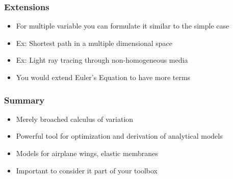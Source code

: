 \documentclass[10pt]{beamer}
\begin{document}
\begin{frame}
  \frametitle{Extensions}
  \begin{itemize}
  \item For multiple variable you can formulate it similar to the simple case
  \item Ex: Shortest path in a multiple dimensional space
  \item Ex: Light ray tracing through non-homogeneous media
  \item You would extend Euler's Equation to have more terms
  \end{itemize}
\end{frame}

\begin{frame}
  \frametitle{Summary}
  \begin{itemize}
  \item Merely broached calculus of variation
  \item Powerful tool for optimization and derivation of analytical models
  \item Models for airplane wings, elastic membranes
  \item Important to consider it part of your toolbox
  \end{itemize}
\end{frame}
\end{document}
